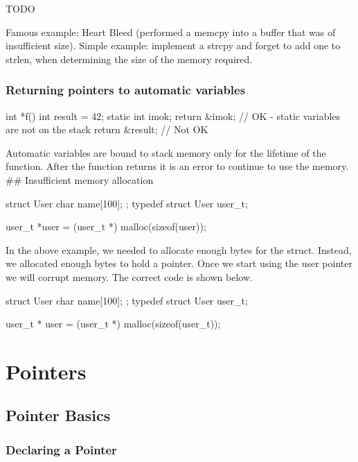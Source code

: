 TODO

Famous example: Heart Bleed (performed a memcpy into a buffer that was of insufficient size). Simple example: implement a strcpy and forget to add one to strlen, when determining the size of the memory required.

\subsubsection{Returning pointers to automatic variables}

\begin{code}[language=C]
int *f() {
    int result = 42;
    static int imok;
    return &imok; // OK - static variables are not on the stack
    return &result; // Not OK
}
\end{code}

Automatic variables are bound to stack memory only for the lifetime of
the function. After the function returns it is an error to continue to
use the memory. \#\# Insufficient memory allocation

\begin{code}[language=C]
struct User {
   char name[100];
};
typedef struct User user_t;

user_t *user = (user_t *) malloc(sizeof(user));
\end{code}

In the above example, we needed to allocate enough bytes for the struct.
Instead, we allocated enough bytes to hold a pointer. Once we start
using the user pointer we will corrupt memory. The correct code is shown
below.

\begin{code}[language=C]
struct User {
   char name[100];
};
typedef struct User user_t;

user_t * user = (user_t *) malloc(sizeof(user_t));
\end{code}


\section{Pointers}

\subsection{Pointer Basics}

\subsubsection{Declaring a Pointer}

